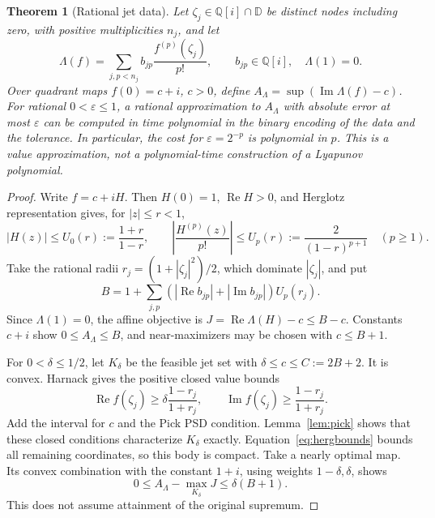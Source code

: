 \documentclass[11pt,a4paper]{article}
\newtheorem{theorem}{Theorem}[section]
\theoremstyle{remark}\newtheorem{remark}[theorem]{Remark}
\newcommand{\D}{\mathbb D}
\newcommand{\Rea}{\operatorname{Re}}
\newcommand{\Ima}{\operatorname{Im}}
\begin{document}
\begin{theorem}[Rational jet data]\label{thm:ratjets}
Let \(\zeta_j\in\mathbb Q[i]\cap\D\) be distinct nodes including
zero, with positive multiplicities \(n_j\), and let
\[
 \Lambda(f)=\sum_{j,p<n_j}b_{jp}\frac{f^{(p)}(\zeta_j)}{p!},
 \qquad b_{jp}\in\mathbb Q[i],\quad\Lambda(1)=0.
\]
Over quadrant maps \(f(0)=c+i\), \(c>0\), define
\(A_\Lambda=\sup(\Ima\Lambda(f)-c)\).
For rational \(0<\varepsilon\leq1\), a rational approximation to
\(A_\Lambda\) with absolute error at most \(\varepsilon\) can be
computed in time polynomial in the binary encoding of the data and
the tolerance. In particular, the cost for \(\varepsilon=2^{-p}\)
is polynomial in \(p\). This is a value approximation, not a
polynomial-time construction of a Lyapunov polynomial.
\end{theorem}
\begin{proof}
Write \(f=c+iH\). Then \(H(0)=1\), \(\Rea H>0\), and
Herglotz representation gives, for \(|z|\leq r<1\),
\begin{equation}\label{eq:hergbounds}
 |H(z)|\leq U_0(r):=\frac{1+r}{1-r},\qquad
 \left|\frac{H^{(p)}(z)}{p!}\right|
 \leq U_p(r):=\frac2{(1-r)^{p+1}}\quad(p\geq1).
\end{equation}
Take the rational radii \(r_j=(1+|\zeta_j|^2)/2\), which dominate
\(|\zeta_j|\), and put
\[
 B=1+\sum_{j,p}(|\Rea b_{jp}|+|\Ima b_{jp}|)U_p(r_j).
\]
Since \(\Lambda(1)=0\), the affine objective is
\(J=\Rea\Lambda(H)-c\leq B-c\). Constants \(c+i\) show
\(0\leq A_\Lambda\leq B\), and near-maximizers may be chosen
with \(c\leq B+1\).

For \(0<\delta\leq1/2\), let \(K_\delta\) be the feasible jet
set with \(\delta\leq c\leq C:=2B+2\). It is convex. Harnack
gives the positive closed value bounds
\[
 \Rea f(\zeta_j)\geq\delta\frac{1-r_j}{1+r_j},\qquad
 \Ima f(\zeta_j)\geq\frac{1-r_j}{1+r_j}.
\]
Add the interval for \(c\) and the Pick PSD condition.
Lemma~\ref{lem:pick} shows that these closed conditions characterize
\(K_\delta\) exactly.
Equation~\eqref{eq:hergbounds} bounds all remaining coordinates,
so this body is compact. Take a nearly optimal map. Its convex
combination with the constant \(1+i\), using weights
\(1-\delta,\delta\), shows
\begin{equation}\label{eq:truncate}
 0\leq A_\Lambda-\max_{K_\delta}J\leq\delta(B+1).
\end{equation}
This does not assume attainment of the original supremum.


\end{proof}
\end{document}
